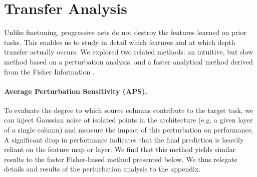 \documentclass{article}
\begin{document}


\section{Transfer Analysis}
\label{sec_transfer}

Unlike finetuning, progressive nets do not destroy the features learned on
prior tasks. This enables us to study in detail which features and at which
depth transfer actually occurs. We explored two related methods: an intuitive,
but slow method based on a perturbation analysis, and a faster analytical method
derived from the Fisher Information \cite{amari98natural}.

\paragraph{Average Perturbation Sensitivity (APS).} To evaluate the degree to
which source columns contribute to the target task, we can inject
Gaussian noise at isolated points in the architecture (e.g. a given
layer of a single column) and measure the impact of this perturbation
on performance. A significant drop in performance indicates that the
final prediction is heavily reliant on the feature map or
layer. We find that this method yields similar results to the faster
Fisher-based method presented below. We thus relegate details and
results of the perturbation analysis to the appendix.
\end{document}
